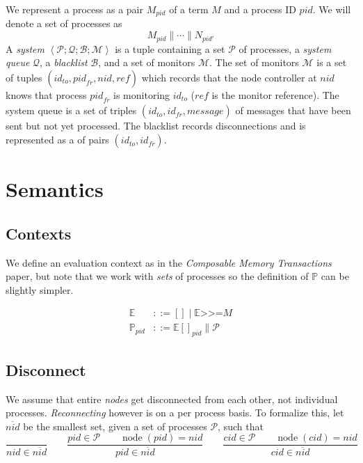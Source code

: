 \documentclass{article}
\newcommand{\sBind}[2]{{#1} \mathrel{\texttt{>}\!\!\texttt{>}\!\texttt{=}} {#2}}
\DeclareMathOperator{\sNodeOf}{node}
\newcommand{\sPar}{\mathrel{\parallel}}
\newcommand{\sProc}[2]{{#1}_{#2}}
\newcommand{\sNid}{\ensuremath{\mathit{nid}}}
\newcommand{\sPid}{\ensuremath{\mathit{pid}}}
\newcommand{\sCid}{\ensuremath{\mathit{cid}}}
\newcommand{\sId}{\ensuremath{\mathit{id}}}
\newcommand{\sRef}{\ensuremath{\mathit{ref}}}
\newcommand{\sSystem}[4]{\left\langle #1 ; #2 ; #3 ; #4 \right\rangle}
\newcommand{\sQueue}{\mathcal{Q}}
\newcommand{\sProcesses}{\mathcal{P}}
\newcommand{\sBlacklist}{\mathcal{B}}
\newcommand{\sMonitors}{\mathcal{M}}
\newcommand{\sCtxt}[1]{\mathbb{#1}}
\newcommand{\OR}{\mathrel{|}}
\begin{document}
We represent a process as a pair $\sProc{M}{\sPid}$ of a term $M$ and a process
ID $\sPid$. We will denote a set of processes as
%
  $$\sProc{M}{\sPid} \sPar \cdots \sPar \sProc{N}{\sPid'}$$
%
A \emph{system} 
  $\sSystem{\sProcesses}{\sQueue}{\sBlacklist}{\sMonitors}$ 
is a tuple containing a set $\sProcesses$ of processes, a \emph{system
queue} $\sQueue$, a \emph{blacklist} $\sBlacklist$, and a set of monitors
$\sMonitors$.
The set of monitors $\sMonitors$ is a set of tuples 
  $(\sId_\mathit{to}, \sPid_\mathit{fr}, \sNid, \sRef)$ 
which records that the node controller at \sNid{} knows that process
$\sPid_\mathit{fr}$ is monitoring $\sId_\mathit{to}$ ($\sRef$ is the monitor
reference).
The system queue is a set of triples $(\sId_\mathit{to}, \sId_\mathit{fr},
\mathit{message})$ of messages that have been sent but not yet processed. The
blacklist records disconnections and is represented as a of pairs
$(\sId_\mathit{to}, \sId_\mathit{fr})$. 

\section{Semantics}

\subsection{Contexts}

We define an evaluation context as in the \textit{Composable Memory
Transactions} paper, but note that we work with \emph{sets} of processes so the
definition of $\sCtxt{P}$ can be slightly simpler. 

\begin{align*}
\sCtxt{E} & ::= [] \OR \sBind{\sCtxt{E}}{M}  \\
\sCtxt{P}_\sPid  & ::= \sCtxt{E}[]_\sPid \sPar \sProcesses
\end{align*}

\subsection{Disconnect}

We assume that entire \emph{nodes} get disconnected from each other, not
individual processes. \emph{Reconnecting} however is on a per process basis. To
formalize this, let $\overline{\sNid}$ be the smallest set, given a set of
processes $\sProcesses$, such that
%
\begin{equation*}
\frac{
}{
\sNid \in \overline{\sNid}
} 
%
\qquad
%
\frac{
\sPid \in \sProcesses \qquad
\sNodeOf(\sPid) = \sNid
}{
\sPid \in \overline{\sNid}
}
%
\qquad
%
\frac{
\sCid \in \sProcesses \qquad
\sNodeOf(\sCid) = \sNid
}{
\sCid \in \overline{\sNid}
}
\end{equation*}
\end{document}
